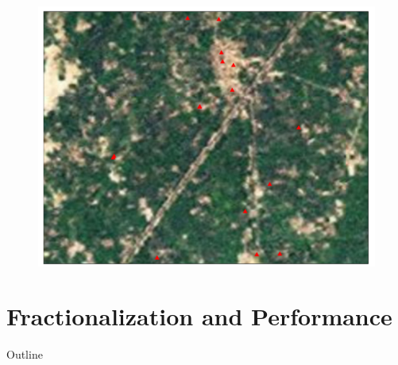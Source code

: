 \documentclass{beamer}
\begin{document}
\begin{frame}{}
	\begin{figure}[htb]
		\begin{center}
		\includegraphics[scale=0.4]{maps/disparate_farming.pdf}
		\end{center}
	\end{figure}
\end{frame}



\section{Fractionalization and Performance}\label{}
\begin{frame}{Outline}
	\tableofcontents[currentsection]
\end{frame}

	
\end{document}
